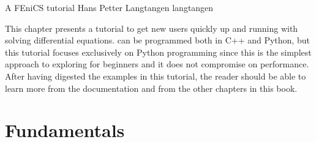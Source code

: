               {A FEniCS tutorial}
              {Hans Petter Langtangen}
              {langtangen}

This chapter presents a \fenics{} tutorial to get new users quickly up and
running with solving differential equations. \fenics{} can be programmed
both in C++ and Python, but this tutorial focuses exclusively on Python
programming since this is the simplest approach to exploring \fenics{} for
beginners and it does not compromise on performance. After having digested
the examples in this tutorial, the reader should be able to learn more
from the \fenics{} documentation and from the other chapters in this book.

\section{Fundamentals}
\label{langtangen:fundamentals}

